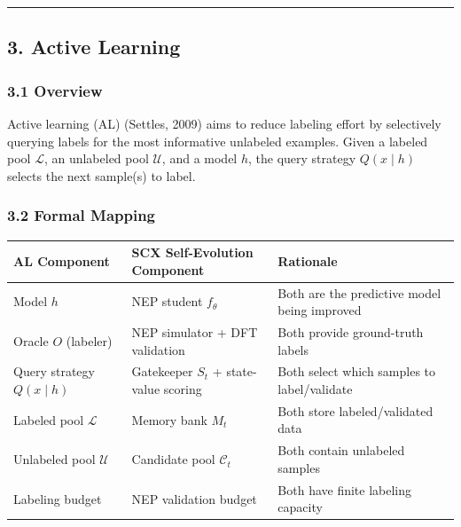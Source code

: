 \documentclass[
  12pt,
]{ctexart}
\begin{document}
\begin{center}\rule{0.5\linewidth}{0.5pt}\end{center}

\subsection{3. Active Learning}\label{active-learning}

\subsubsection{3.1 Overview}\label{overview-2}

Active learning (AL) (Settles, 2009) aims to reduce labeling effort by
selectively querying labels for the most informative unlabeled examples.
Given a labeled pool \(\mathcal{L}\), an unlabeled pool \(\mathcal{U}\),
and a model \(h\), the query strategy \(Q(x \mid h)\) selects the next
sample(s) to label.

\subsubsection{3.2 Formal Mapping}\label{formal-mapping-2}

\begin{longtable}[]{@{}
  >{\raggedright\arraybackslash}p{}
  >{\raggedright\arraybackslash}p{}
  >{\raggedright\arraybackslash}p{}@{}}
\toprule\noalign{}
\begin{minipage}[b]{\linewidth}\raggedright
AL Component
\end{minipage} & \begin{minipage}[b]{\linewidth}\raggedright
SCX Self-Evolution Component
\end{minipage} & \begin{minipage}[b]{\linewidth}\raggedright
Rationale
\end{minipage} \\
\midrule\noalign{}
\endhead
\bottomrule\noalign{}
\endlastfoot
Model \(h\) & NEP student \(f_\theta\) & Both are the predictive model
being improved \\
Oracle \(O\) (labeler) & NEP simulator + DFT validation & Both provide
ground-truth labels \\
Query strategy \(Q(x \mid h)\) & Gatekeeper \(S_t\) + state-value
scoring & Both select which samples to label/validate \\
Labeled pool \(\mathcal{L}\) & Memory bank \(M_t\) & Both store
labeled/validated data \\
Unlabeled pool \(\mathcal{U}\) & Candidate pool \(\mathcal{C}_t\) & Both
contain unlabeled samples \\
Labeling budget & NEP validation budget & Both have finite labeling
capacity \\
\end{longtable}
\end{document}
